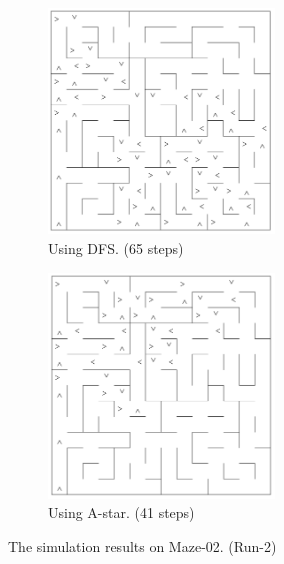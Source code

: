 \documentclass[11pt, oneside]{article}   	%
\begin{document}
\begin{figure}
\centering
\begin{subfigure}{7cm}
  \centering
  \includegraphics[width=6cm]{maze-02-dfs.png}
  \caption{Using DFS. (65 steps)}
  \label{fig:maze-02-dfs}
\end{subfigure}%
\begin{subfigure}{7cm}
  \centering
  \includegraphics[width=6cm]{maze-02-astar-h1.png}
  \caption{Using A-star. (41 steps)}
  \label{fig:maze-02-astar-h1}
\end{subfigure}
\caption{The simulation results on Maze-02. (Run-2)}
\label{fig:maze-02}
\end{figure}
\end{document}
